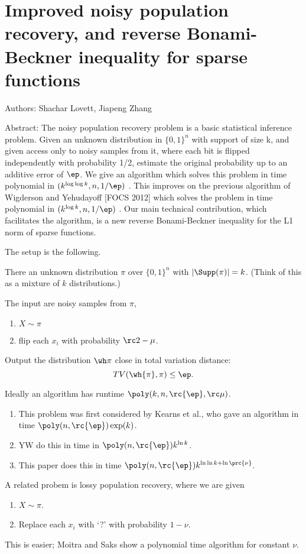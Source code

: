\section{Improved noisy population recovery, and reverse Bonami-Beckner inequality
for sparse functions
}


Authors: Shachar Lovett, Jiapeng Zhang

Abstract:
The noisy population recovery problem is a basic statistical inference
problem. Given an unknown distribution in $\{0,1\}^n$  with support of size k,
and given access only to noisy samples from it, where each bit is flipped
independently with probability 1/2,
estimate the original probability up to an additive error of $\ep$. We give
an algorithm which solves this problem in time polynomial in $(k^{\log\log k},
n, 1/\ep)$ .
This improves on the previous algorithm of Wigderson and Yehudayoff [FOCS
2012] which solves the problem in time polynomial in $(k^{\log k}, n, 1/\ep)$ .
Our main technical contribution, which facilitates the algorithm, is a new
reverse Bonami-Beckner inequality for the L1 norm of sparse functions.

The setup is the following. 
\begin{prb}
There an unknown distribution $\pi$ over $\{0,1\}^n$ with $|\Supp(\pi)|=k$. (Think of this as a mixture of $k$ distributions.)

The input are noisy samples from $\pi$,
\begin{enumerate}
\item
$X\sim \pi$
\item
flip each $x_i$ with probability $\rc2-\mu$.
\end{enumerate}

Output the distribution $\wh\pi$ close in total variation distance:
\[
TV(\wh{\pi},\pi)\le \ep.
\]
\end{prb}
Ideally an algorithm has runtime $\poly(k,n,\rc{\ep},\rc \mu)$.
\begin{enumerate}
\item
This problem was first considered by Kearns et al., who gave an algorithm in time $\poly(n,\rc{\ep})\exp(k)$.
\item
YW do this in time in $\poly(n,\rc{\ep})k^{\ln k}$.
\item This paper does this in time $\poly(n,\rc{\ep})k^{\ln\ln k+\ln\prc{\nu}}$.
\end{enumerate}
A related probem is lossy population recovery, where we are given
\begin{enumerate}
\item
$X\sim \pi$.
\item Replace each $x_i$ with `?' with probability $1-\nu$. 
\end{enumerate}
This is easier; Moitra and Saks show a polynomial time algorithm for constant $\nu$.

